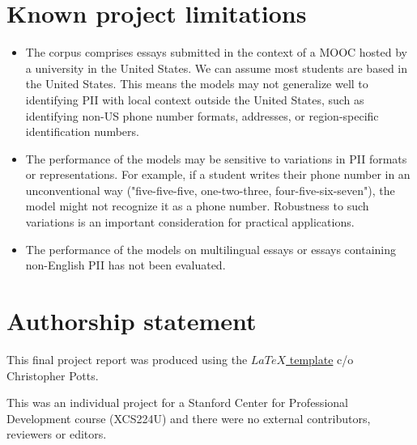\documentclass[11pt]{article}
\begin{document}
\section*{Known project limitations}

\begin{itemize}
\item The corpus comprises essays submitted in the context of a MOOC hosted by a university in the United States. We can assume most students are based in the United States. This means the models may not generalize well to identifying PII with local context outside the United States, such as identifying non-US phone number formats, addresses, or region-specific identification numbers.
\item The performance of the models may be sensitive to variations in PII formats or representations. For example, if a student writes their phone number in an unconventional way ("five-five-five, one-two-three, four-five-six-seven"), the model might not recognize it as a phone number. Robustness to such variations is an important consideration for practical applications.
\item The performance of the models on multilingual essays or essays containing non-English PII has not been evaluated.
\end{itemize}

\section*{Authorship statement}

This final project report was produced using the \href{https://www.overleaf.com/project/6237af8bd773a40c9da88358}{$LaTeX$ template} c/o Christopher Potts.

This was an individual project for a Stanford Center for Professional Development course (XCS224U) and there were no external contributors, reviewers or editors.


\end{document}
